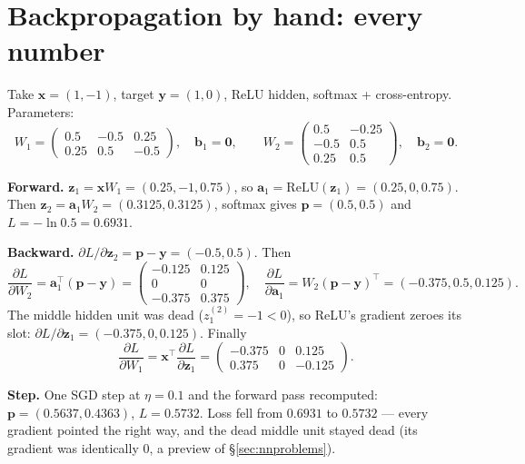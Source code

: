 \section{Backpropagation by hand: every number}
\label{sec:byhand}

\begin{example}
\label{ex:byhand}
Take $\mathbf x=(1,-1)$, target $\mathbf y=(1,0)$, ReLU hidden,
softmax + cross-entropy. Parameters:
\[
W_1=\begin{pmatrix}0.5&-0.5&0.25\\0.25&0.5&-0.5\end{pmatrix},\quad
\mathbf b_1=\mathbf 0,\qquad
W_2=\begin{pmatrix}0.5&-0.25\\-0.5&0.5\\0.25&0.5\end{pmatrix},\quad
\mathbf b_2=\mathbf 0 .
\]

\textbf{Forward.} $\mathbf z_1=\mathbf xW_1=(0.25,-1,0.75)$, so
$\mathbf a_1=\mathrm{ReLU}(\mathbf z_1)=(0.25,0,0.75)$. Then
$\mathbf z_2=\mathbf a_1W_2=(0.3125,0.3125)$, softmax gives
$\mathbf p=(0.5,0.5)$ and $L=-\ln 0.5=0.6931$.

\textbf{Backward.} $\partial L/\partial\mathbf z_2=\mathbf p-\mathbf
y=(-0.5,0.5)$. Then
\[
\frac{\partial L}{\partial W_2}=\mathbf a_1^{\top}(\mathbf p-\mathbf y)
=\begin{pmatrix}-0.125&0.125\\0&0\\-0.375&0.375\end{pmatrix},\quad
\frac{\partial L}{\partial\mathbf a_1}=W_2(\mathbf p-\mathbf y)^{\top}
=(-0.375,0.5,0.125).
\]
The middle hidden unit was dead ($z_1^{(2)}=-1<0$), so ReLU's gradient
zeroes its slot: $\partial L/\partial\mathbf
z_1=(-0.375,0,0.125)$. Finally
\[
\frac{\partial L}{\partial W_1}=\mathbf x^{\top}
\frac{\partial L}{\partial \mathbf z_1}
=\begin{pmatrix}-0.375&0&0.125\\0.375&0&-0.125\end{pmatrix}.
\]

\textbf{Step.} One SGD step at $\eta=0.1$ and the forward pass
recomputed: $\mathbf p=(0.5637,0.4363)$, $L=0.5732$. Loss fell from
$0.6931$ to $0.5732$ --- every gradient pointed the right way, and the
dead middle unit stayed dead (its gradient was identically 0, a preview
of \S\ref{sec:nnproblems}).
\end{example}

